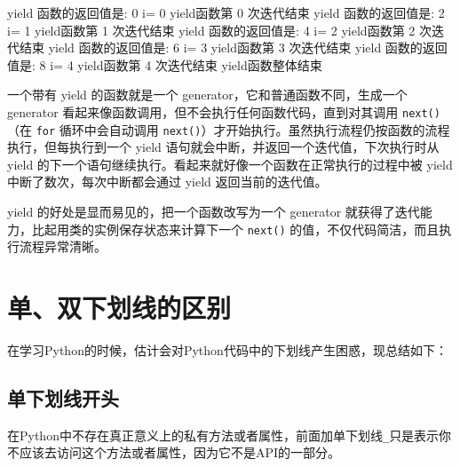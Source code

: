 \documentclass[]{ctexbook}
\newenvironment{Shaded}{\begin{snugshade}}{\end{snugshade}}
\newcommand{\ExtensionTok}[1]{#1}
\newcommand{\NormalTok}[1]{#1}
\newcommand{\VariableTok}[1]{\textcolor[rgb]{0.00,0.00,0.00}{#1}}
\begin{document}
\begin{Shaded}
\begin{Highlighting}[]
\ExtensionTok{yield}\NormalTok{ 函数的返回值是: 0}
\VariableTok{i=} \ExtensionTok{0}
\ExtensionTok{yield}\NormalTok{函数第 0 次迭代结束}
\ExtensionTok{yield}\NormalTok{ 函数的返回值是: 2}
\VariableTok{i=} \ExtensionTok{1}
\ExtensionTok{yield}\NormalTok{函数第 1 次迭代结束}
\ExtensionTok{yield}\NormalTok{ 函数的返回值是: 4}
\VariableTok{i=} \ExtensionTok{2}
\ExtensionTok{yield}\NormalTok{函数第 2 次迭代结束}
\ExtensionTok{yield}\NormalTok{ 函数的返回值是: 6}
\VariableTok{i=} \ExtensionTok{3}
\ExtensionTok{yield}\NormalTok{函数第 3 次迭代结束}
\ExtensionTok{yield}\NormalTok{ 函数的返回值是: 8}
\VariableTok{i=} \ExtensionTok{4}
\ExtensionTok{yield}\NormalTok{函数第 4 次迭代结束}
\ExtensionTok{yield}\NormalTok{函数整体结束}
\end{Highlighting}
\end{Shaded}

一个带有 yield 的函数就是一个 generator，它和普通函数不同，生成一个 generator 看起来像函数调用，但不会执行任何函数代码，直到对其调用 \texttt{next()}（在 \texttt{for} 循环中会自动调用 \texttt{next()}）才开始执行。虽然执行流程仍按函数的流程执行，但每执行到一个 yield 语句就会中断，并返回一个迭代值，下次执行时从 yield 的下一个语句继续执行。看起来就好像一个函数在正常执行的过程中被 yield 中断了数次，每次中断都会通过 yield 返回当前的迭代值。

yield 的好处是显而易见的，把一个函数改写为一个 generator 就获得了迭代能力，比起用类的实例保存状态来计算下一个 \texttt{next()} 的值，不仅代码简洁，而且执行流程异常清晰。

\hypertarget{underline}{%
\chapter{单、双下划线的区别}\label{underline}}

在学习Python的时候，估计会对Python代码中的下划线产生困惑，现总结如下：

\hypertarget{ux5355ux4e0bux5212ux7ebfux5f00ux5934}{%
\section{单下划线开头}\label{ux5355ux4e0bux5212ux7ebfux5f00ux5934}}

在Python中不存在真正意义上的私有方法或者属性，前面加单下划线\texttt{\_}只是表示你不应该去访问这个方法或者属性，因为它不是API的一部分。
\end{document}
